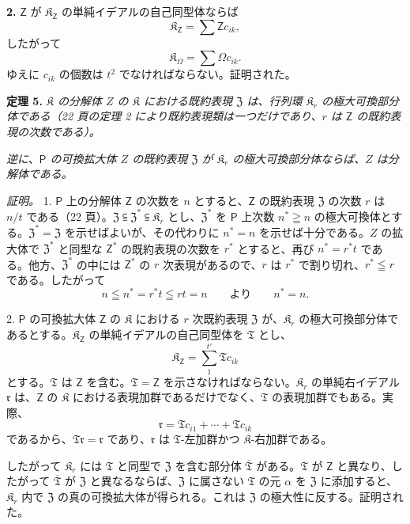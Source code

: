 \textbf{2.} $\mathsf{Z}$ が $\mathfrak K_{\mathsf{Z}}$ の単純イデアルの自己同型体ならば
\[
\mathfrak K_{\mathsf{Z}}=\sum\mathsf Zc_{ik},
\]
したがって
\[
\mathfrak K_\Omega=\sum\Omega c_{ik}.
\]
ゆえに $c_{ik}$ の個数は $t^2$ でなければならない。証明された。

\textbf{定理 5.} \emph{$\mathfrak K$ の分解体 $Z$ の $\mathfrak K$ における既約表現 $\mathfrak Z$ は、行列環 $\mathfrak K_r$ の極大可換部分体である（22 頁の定理 2 により既約表現類は一つだけであり、$r$ は $\mathsf{Z}$ の既約表現の次数である）。}

\emph{逆に、$\mathsf P$ の可換拡大体 $Z$ の既約表現 $\mathfrak Z$ が $\mathfrak K_r$ の極大可換部分体ならば、$Z$ は分解体である。}

\emph{証明。} 1. $\mathsf P$ 上の分解体 $\mathsf{Z}$ の次数を $n$ とすると、$\mathsf{Z}$ の既約表現 $\mathfrak Z$ の次数 $r$ は $n/t$ である（22 頁）。$\mathfrak Z\subseteqq\mathfrak Z^*\subseteqq\mathfrak K_r$ とし、$\mathfrak Z^*$ を $\mathsf P$ 上次数 $n^*\geqq n$ の極大可換体とする。$\mathfrak Z^*=\mathfrak Z$ を示せばよいが、その代わりに $n^*=n$ を示せば十分である。$Z$ の拡大体で $\mathfrak Z^*$ と同型な $\mathsf{Z}^*$ の既約表現の次数を $r^*$ とすると、再び $n^*=r^*t$ である。他方、$\mathfrak Z^*$ の中には $\mathsf{Z}^*$ の $r$ 次表現があるので、$r$ は $r^*$ で割り切れ、$r^*\leqq r$ である。したがって
\[
n\leqq n^*=r^*t\leqq rt=n \qquad\text{より}\qquad n^*=n.
\]

2. $\mathsf P$ の可換拡大体 $\mathsf{Z}$ の $\mathfrak K$ における $r$ 次既約表現 $\mathfrak Z$ が、$\mathfrak K_r$ の極大可換部分体であるとする。$\mathfrak K_{\mathsf{Z}}$ の単純イデアルの自己同型体を $\mathfrak T$ とし、
\[
\mathfrak K_{\mathsf{Z}}=\sum_{1}^{t'}\mathfrak T c_{ik}
\]
とする。$\mathfrak T$ は $\mathsf{Z}$ を含む。$\mathfrak T=\mathsf{Z}$ を示さなければならない。$\mathfrak K_r$ の単純右イデアル $\mathfrak r$ は、$\mathsf{Z}$ の $\mathfrak K$ における表現加群であるだけでなく、$\mathfrak T$ の表現加群でもある。実際、
\[
\mathfrak r=\mathfrak T c_{i1}+\cdots+\mathfrak T c_{ik}
\]
であるから、$\mathfrak T\mathfrak r=\mathfrak r$ であり、$\mathfrak r$ は $\mathfrak T$-左加群かつ $\mathfrak K$-右加群である。

したがって $\mathfrak K_r$ には $\mathfrak T$ と同型で $\mathfrak Z$ を含む部分体 $\overline{\mathfrak T}$ がある。$\mathfrak T$ が $\mathsf{Z}$ と異なり、したがって $\overline{\mathfrak T}$ が $\mathfrak Z$ と異なるならば、$\mathfrak Z$ に属さない $\mathfrak T$ の元 $\alpha$ を $\mathfrak Z$ に添加すると、$\mathfrak K_r$ 内で $\mathfrak Z$ の真の可換拡大体が得られる。これは $\mathfrak Z$ の極大性に反する。証明された。

